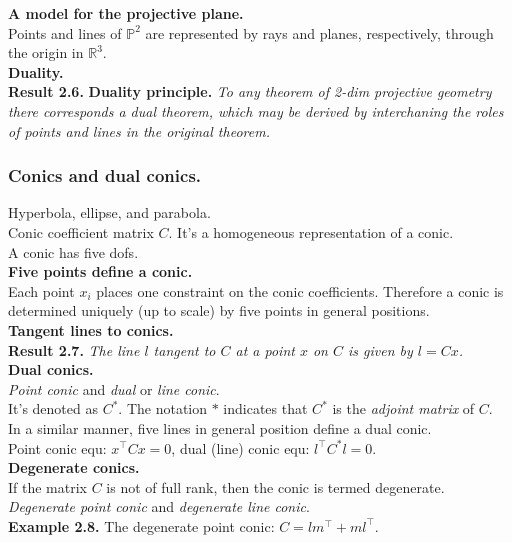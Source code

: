 \documentclass[12pt]{article}
\begin{document}
\noindent \textbf{A model for the projective plane.} \\
Points and lines of $\mathbb{P}^2$ are represented by rays and planes, respectively, through the origin in $\mathbb{R}^3$. \\

\noindent \textbf{Duality.} \\
\textbf{Result 2.6.} \textbf{Duality principle.} \textit{To any theorem of 2-dim projective geometry there corresponds a dual theorem, 
which may be derived by interchaning the roles of points and lines in the original theorem.}

\subsubsection{Conics and dual conics.} 
Hyperbola, ellipse, and parabola. \\
Conic coefficient matrix $C$. It's a homogeneous representation of a conic. \\
A conic has five dofs. \\

\noindent \textbf{Five points define a conic.} \\
Each point $x_i$ places one constraint on the conic coefficients. 
Therefore a conic is determined uniquely (up to scale) by five points in general positions. \\

\noindent \textbf{Tangent lines to conics.} \\
\textbf{Result 2.7.} \textit{The line $l$ tangent to $C$ at a point $x$ on $C$ is given by $l = Cx$.} \\

\noindent \textbf{Dual conics.} \\
\textit{Point conic} and \textit{dual} or \textit{line conic}. \\
It's denoted as $C^*$. The notation $*$ indicates that $C^*$ is the \textit{adjoint matrix} of $C$. \\
In a similar manner, five lines in general position define a dual conic. \\
Point conic equ: $x^\top Cx=0$, dual (line) conic equ: $l^\top C^*l=0$. \\

\noindent \textbf{Degenerate conics.} \\
If the matrix $C$ is not of full rank, then the conic is termed degenerate. \\
\textit{Degenerate point conic} and \textit{degenerate line conic}. \\
\textbf{Example 2.8.} The degenerate point conic: $C = lm^\top + ml^\top$. 
\end{document}
